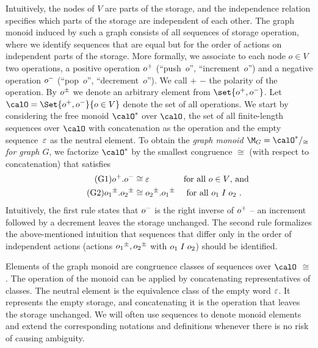 \documentclass[../../diss.tex]{subfiles}
\begin{document}
Intuitively, the nodes of $V$ are parts of the storage, and the independence relation specifies which parts of the storage are independent of each other.
The graph monoid induced by such a graph consists of all sequences of storage operation, where we identify sequences that are equal but for the order of actions on independent parts of the storage.
More formally, we associate to each node $o \in V$ two operations, a positive operation ${o}^+$ (\enquote{push~$o$}, \enquote{increment~$o$}) and a negative operation ${o}^-$ (\enquote{pop~$o$}, \enquote{decrement~$o$}).
We call $+$ \resp $-$ the polarity of the operation.
By ${o}^\pm$ we denote an arbitrary element from $\set{ \inc{o}, \dec{o}}$.
Let $\ops = \Set{ \inc{o}, \dec{o} }{ o \in V }$ denote the set of all operations.
We start by considering the free monoid $\ops^*$ over $\ops$, \ie the set of all finite-length sequences over $\ops$ with concatenation as the operation and the empty sequence~$\varepsilon$ as the neutral element.
To obtain the \emph{graph monoid $\graphmonoid = \ops^* /_{\cong}$ for graph $G$}, we factorize $\ops^*$ by the smallest congruence $\cong$ (with respect to concatenation) that satisfies
\begin{align}
    \label{Rule:Cancel}\tag{G1}
        {o}^+.{o}^- &\cong \varepsilon
        \quad\quad\quad\hspace*{0.7em} \text{ for all } o \in V
        \text{, and}
        \\
    \label{Rule:Swap}\tag{G2}
        {o_1}^\pm.{o_2}^\pm &\cong {o_2}^\pm.{o_1}^\pm
        \quad \text{ for all } o_1 \mathrel{I} o_2
        \ .
\end{align}
Intuitively, the first rule states that ${o}^-$ is the right inverse of ${o}^+$ -- an increment followed by a decrement leaves the storage unchanged.
The second rule formalizes the above-mentioned intuition that sequences that differ only in the order of independent actions (actions ${o_1}^\pm,{o_2}^\pm$ with $o_1 \mathrel{I} o_2$) should be identified.

Elements of the graph monoid are congruence classes of sequences over $\ops$ \wrt $\cong$.
The operation of the monoid can be applied by concatenating representatives of classes.
The neutral element is the equivalence class of the empty word $\varepsilon$.
It represents the empty storage, and concatenating it is the operation that leaves the storage unchanged.
We will often use sequences to denote monoid elements and extend the corresponding notations and definitions whenever there is no risk of causing ambiguity.
\end{document}
